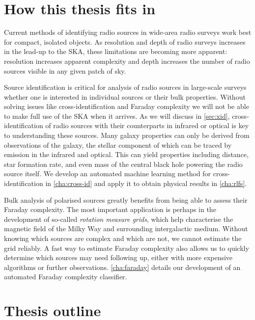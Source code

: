 \documentclass[11pt, a4paper]{book}
\newcommand{\defn}[1]{\emph{#1}}
\providecommand{\DIFaddtex}[1]{{\protect\color{blue}\uwave{#1}}} %
\providecommand{\DIFaddbegin}{} %
\providecommand{\DIFaddend}{} %
\providecommand{\DIFadd}[1]{\texorpdfstring{\DIFaddtex{#1}}{#1}} %
\newcommand{\DIFaddincludegraphics}[2][]{{\color{blue}\fbox{\DIFOincludegraphics[#1]{#2}}}} %
\DeclareRobustCommand{\DIFaddbegin}{\DIFOaddbegin \let\includegraphics\DIFaddincludegraphics} %
\DeclareRobustCommand{\DIFaddend}{\DIFOaddend \let\includegraphics\DIFOincludegraphics} %
\begin{document}
\section{How this thesis fits in}
\label{sec:how-this-fits}

    Current methods of identifying radio sources in wide-area radio surveys work best for compact, isolated objects. As resolution and depth of radio surveys increases in the lead-up to the SKA, these limitations are becoming more apparent: resolution increases apparent complexity and depth increases the number of radio sources visible in any given patch of sky.

    Source identification is critical for analysis of radio sources in large-scale surveys whether one is interested in individual sources or their bulk properties. Without solving issues like cross-identification and Faraday complexity we will not be able to make full use of the SKA when it arrives. As we will discuss in \autoref{sec:xid}, cross-identification of radio sources with their counterparts in infrared or optical is key to understanding these sources. Many \DIFaddbegin \DIFadd{radio }\DIFaddend galaxy properties can only be derived from \DIFaddbegin \DIFadd{non-radio }\DIFaddend observations of the galaxy, the stellar component of which can be traced by emission in the infrared and optical. This can yield properties including distance, star formation rate, and even mass of the central black hole powering the radio source itself. We develop an automated machine learning method for cross-identification in \autoref{cha:cross-id} and apply it to obtain physical results in \autoref{cha:rlfs}.

    Bulk analysis of polarised sources greatly benefits from being able to assess their Faraday complexity. The most important application is perhaps in the development of so-called \defn{rotation measure grids}, which help characterise the magnetic field of the Milky Way and surrounding intergalactic medium. Without knowing which sources are complex and which are not, we cannot estimate the grid reliably. A fast way to estimate Faraday complexity also allows us to quickly determine which sources may need following up, either with more expensive algorithms or further observations. \autoref{cha:faraday} details our development of an automated Faraday complexity classifier.

\section{Thesis outline}
\label{sec:outline}
\end{document}
